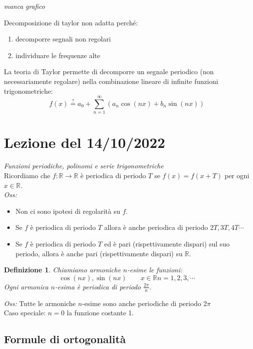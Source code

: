 \documentclass{scrreprt}
\newtheorem{defn}{Definizione}
\newenvironment{definition}{\begin{mdframed}[backgroundcolor=Ivory2]\begin{defn}}{\end{defn}\end{mdframed}}
\begin{document}
\emph{manca grafico}

Decomposizione di taylor non adatta perché:
\begin{enumerate}
	\item decomporre segnali non regolari
	\item individuare le frequenze alte
\end{enumerate}
La teoria di Taylor permette di decomporre un segnale periodico (non necessariamente regolare) nella combinazione lineare di infinite funzioni trigonometriche:
\begin{equation}
	f(x) \stackrel{?}{=} a_0 + \sum_{n=1}^\infty \left(a_n \cos(nx) + b_n \sin(nx)\right)
\end{equation}
\section*{Lezione del 14/10/2022}

\emph{Funzioni periodiche, polinomi e serie trigonometriche}\\
Ricordiamo che $f:\mathbb{R}\to\mathbb{R}$ è periodica di periodo $T$ se  $f(x)=f(x+T)$ per ogni $x\in\mathbb{R}$.\\
\emph{Oss:} 
\begin{itemize}
	\item Non ci sono ipotesi di regolarità su $f$.
	\item Se $f$ è periodica di periodo $T$ allora è anche periodica di periodo $2T, 3T, 4T \cdots$
	\item Se $f$ è periodica di periodo $T$ ed è pari (rispettivamente dispari) sul suo periodo, allora è anche pari (rispettivamente dispari) su $\mathbb{R}$.
\end{itemize}

\begin{definition}
	Chiamiamo armoniche $n$-esime le funzioni:
	\begin{equation}
		\cos(nx), \sin(nx)\quad \quad x\in\mathbb{R} n=1,2,3,\cdots
	\end{equation}
	Ogni armonica $n$-esima è periodica di periodo $\frac{2\pi}{n}$.
\end{definition}
\emph{Oss:} Tutte le armoniche $n$-esime sono anche periodiche di periodo $2\pi$\\
Caso speciale: $n=0$ la funzione costante 1.

\subsection{Formule di ortogonalità} %
\end{document}
